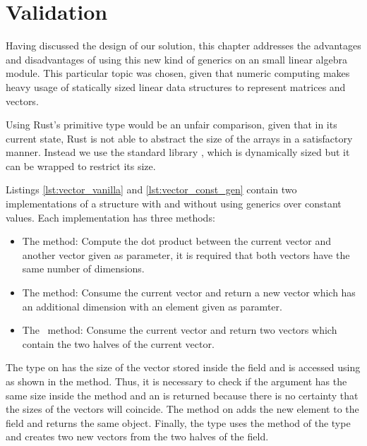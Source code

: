 \chapter{Validation}
\label{chap:validation}

Having discussed the design of our solution, this chapter addresses the
advantages and disadvantages of using this new kind of generics on an small
linear algebra module. This particular topic was chosen, given that numeric
computing makes heavy usage of statically sized linear data structures to
represent matrices and vectors.

Using Rust's  primitive type would be an unfair comparison,
given that in its current state, Rust is not able to abstract the size of the
arrays in a satisfactory manner. Instead we use the standard library
, which is dynamically sized but it can be wrapped to restrict its
size.

Listings \ref{lst:vector_vanilla} and \ref{lst:vector_const_gen} contain two
implementations of a  structure with and without using generics
over constant values. Each implementation has three methods:

\begin{itemize}
    \item The  method: Compute the dot product between the current
        vector and another vector given as parameter, it is required that both
        vectors have the same number of dimensions.  
    \item The  method: Consume the current vector and return a
        new vector which has an additional dimension with an element given as
        paramter.  
    \item The  \ method: Consume the current vector and return two
        vectors which contain the two halves of the current vector.  
\end{itemize}

The  type on  has the size of the vector
stored inside the  field and is accessed using
 as shown in the  method. Thus, it is
necessary to check if the  argument has the same size inside the
 method and an  is returned because there is no
certainty that the sizes of the vectors will coincide. The 
method on  adds the new element to the 
field and returns the same object. Finally, the  type uses the
method  of the  type and creates two new vectors
from the two halves of the  field.

